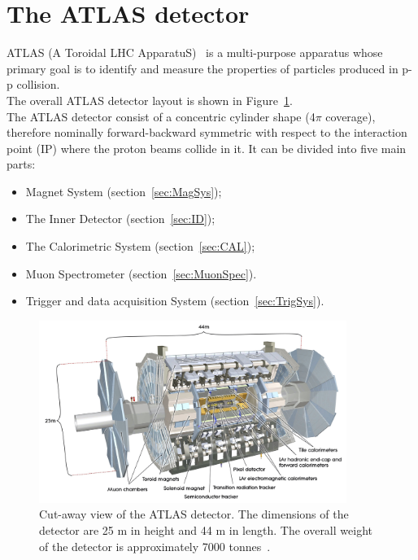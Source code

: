 \section{The ATLAS detector}
ATLAS (A Toroidal LHC ApparatuS)~\cite{ATLAS} is a multi-purpose apparatus whose primary goal is to identify and measure the properties of particles produced in p-p collision.\\
The overall ATLAS detector layout is shown in Figure~\ref{fig:ATLAS}.\\
The ATLAS detector consist of a concentric cylinder shape (4$\pi$ coverage), therefore nominally forward-backward symmetric with respect to the interaction point (IP) where the proton beams collide in it.
It can be divided into five main parts:
\begin{itemize}
	\item Magnet System (section~\ref{sec:MagSys});
	\item The Inner Detector  (section~\ref{sec:ID});
	\item The Calorimetric System  (section~\ref{sec:CAL});
	\item Muon Spectrometer  (section~\ref{sec:MuonSpec}).
	\item Trigger and data acquisition System  (section~\ref{sec:TrigSys}).
\end{itemize}
\begin{figure}[h]
	\centering
	\includegraphics[width=10cm]{Chapters/CH2/figures/ATLAS}
	\caption{Cut-away view of the ATLAS detector. The dimensions of the detector are 25 m in height and 44 m in length. The overall weight of the detector is approximately 7000 tonnes~\cite{ATLAS}.}
	\label{fig:ATLAS}
\end{figure}
\FloatBarrier
